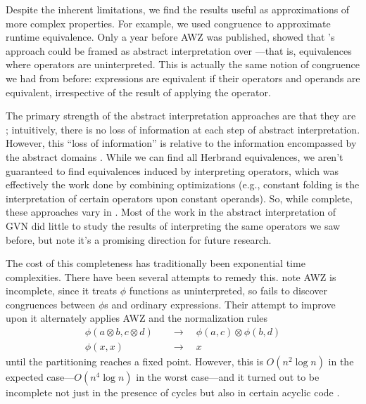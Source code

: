 
Despite the inherent limitations, we find the results useful as approximations
of more complex properties.  For example, we used congruence to approximate
runtime equivalence.  Only a year before AWZ was published,
\citeauthor{Steffen} \autocite*{Steffen} showed that \citeauthor{Kildall}'s
approach could be framed as abstract interpretation over ---that is, equivalences where operators are uninterpreted.  This
is actually the same notion of congruence we had from before: expressions are
equivalent if their operators and operands are equivalent, irrespective of the
result of applying the operator.

The primary strength of the abstract interpretation approaches are that they
are ; intuitively, there is no loss of information at each step
of abstract interpretation.  However, this ``loss of information'' is relative
to the information encompassed by the abstract domains \autocite{Completeness}.
While we can find all Herbrand equivalences, we aren't guaranteed to find
equivalences induced by interpreting operators, which was effectively the work
done by combining optimizations (e.g., constant folding is the interpretation
of certain operators upon constant operands).  So, while complete, these
approaches vary in .  Most of the work in the abstract
interpretation of \gls{GVN} did little to study the results of interpreting the
same operators we saw before, but note it's a promising direction for future
research.

The cost of this completeness has traditionally been exponential time
complexities.  There have been several attempts to remedy this.
 \autocite*{RKS} note AWZ is incomplete, since it treats $\phi$
functions as uninterpreted, so fails to discover congruences between $\phi$s
and ordinary expressions.  Their attempt to improve upon it alternately applies
AWZ and the normalization rules
\begin{align*}
  \phi(a\otimes b, c\otimes d) &\quad\to\quad \phi(a,c) \otimes \phi(b,d) \\
  \phi(x, x) &\quad\to\quad x
\end{align*}
until the partitioning reaches a fixed point.  However, this is $O(n^2 \log n)$
in the expected case---$O(n^4 \log n)$ in the worst case---and it turned out to
be incomplete not just in the presence of cycles \autocite{RKS} but also in
certain acyclic code \autocite{Gulwani07}.

